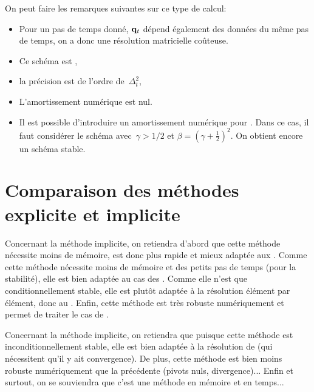 \medskip
On peut faire les remarques suivantes sur ce type de calcul:
\begin{itemize}
  \item Pour un pas de temps donné, $\VV{q}_t$ dépend également des données du même pas de temps,
	on a donc une résolution matricielle coûteuse.
  \item Ce schéma est , 
  \item la précision est de l'ordre de~$\Delta_t^2$, 
  \item L'amortissement numérique est nul.
  \item Il est possible d'introduire un amortissement numérique pour . Dans ce cas, il faut considérer le schéma avec~$\gamma>1/2$ et
	$\beta=(\gamma+\frac12)^2$. On obtient encore un schéma stable.
\end{itemize}




\bigskip
\section{Comparaison des méthodes explicite et implicite}

\medskip
Concernant la méthode implicite, on retiendra d'abord que cette méthode nécessite moins de mémoire, est donc plus
	rapide et mieux adaptée aux .
Comme cette méthode nécessite moins de mémoire et des petits pas de temps (pour la stabilité),
	elle est bien adaptée au cas des .
Comme elle n'est que conditionnellement stable, elle est plutôt adaptée à la résolution élément
	par élément, donc au .
Enfin, cette méthode est très robuste numériquement et permet de traiter le cas de .


\medskip
Concernant la méthode implicite, on retiendra que puisque cette méthode est inconditionnellement stable, elle est bien adaptée à la résolution
	de  (qui nécessitent qu'il y ait convergence).
De plus, cette méthode est bien moins robuste numériquement que la précédente (pivots nuls,
	divergence)...
Enfin et surtout, on se souviendra que c'est une méthode  en
	mémoire et en temps...

